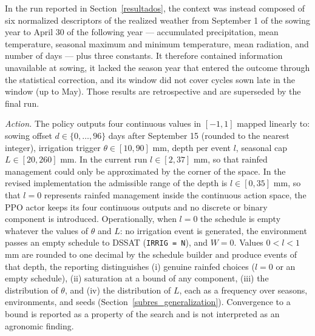 \documentclass[times,final,authoryear]{elsarticle}
\begin{document}
In the run reported in Section~\ref{resultados}, the context was instead composed of six normalized descriptors of the realized weather from September 1 of the sowing year to April 30 of the following year --- accumulated precipitation, mean temperature, seasonal maximum and minimum temperature, mean radiation, and number of days --- plus three constants. It therefore contained information unavailable at sowing, it lacked the season year that entered the outcome through the statistical correction, and its window did not cover cycles sown late in the window (up to May). Those results are retrospective and are superseded by the final run.

\emph{Action.} The policy outputs four continuous values in $[-1,1]$ mapped linearly to: sowing offset $d \in \{0,\dots,96\}$ days after September 15 (rounded to the nearest integer), irrigation trigger $\theta \in [10, 90]$ mm, depth per event $l$, seasonal cap $L \in [20, 260]$ mm. In the current run $l \in [2, 37]$ mm, so that rainfed management could only be approximated by the corner of the space. In the revised implementation the admissible range of the depth is $l \in [0, 35]$ mm, so that $l = 0$ represents rainfed management inside the continuous action space, the PPO actor keeps its four continuous outputs and no discrete or binary component is introduced. Operationally, when $l = 0$ the schedule is empty whatever the values of $\theta$ and $L$: no irrigation event is generated, the environment passes an empty schedule to DSSAT (\texttt{IRRIG = N}), and $W = 0$. Values $0 < l < 1$ mm are rounded to one decimal by the schedule builder and produce events of that depth, the reporting distinguishes (i) genuine rainfed choices ($l = 0$ or an empty schedule), (ii) saturation at a bound of any component, (iii) the distribution of $\theta$, and (iv) the distribution of $L$, each as a frequency over seasons, environments, and seeds (Section~\ref{subres_generalization}). Convergence to a bound is reported as a property of the search and is not interpreted as an agronomic finding.
\end{document}
